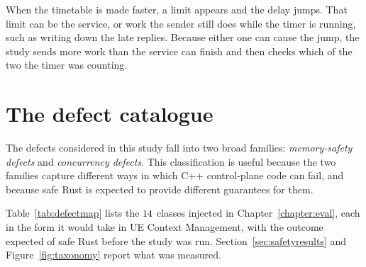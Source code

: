 \documentclass[english,oneside,a4paper,censored,csm,software-track-2020]{HYthesisML}
\begin{document}
When the timetable is made faster, a limit appears and the delay jumps. That limit can
be the service, or work the sender still does while the timer is running, such as writing
down the late replies. Because either one can cause the jump, the study sends more work
than the service can finish and then checks which of the two the timer was counting.

\section{The defect catalogue}\label{sec:defects}
The defects considered in this study fall into two broad families:
\emph{memory-safety defects} and \emph{concurrency defects}. This
classification is useful because the two families capture different ways in
which C++ control-plane code can fail, and because safe Rust is expected to
provide different guarantees for them.

Table~\ref{tab:defectmap} lists the $14$ classes injected in
Chapter~\ref{chapter:eval}, each in the form it would take in UE Context
Management, with the outcome expected of safe Rust before the study was run.
Section~\ref{sec:safetyresults} and Figure~\ref{fig:taxonomy} report what was
measured.
\end{document}

